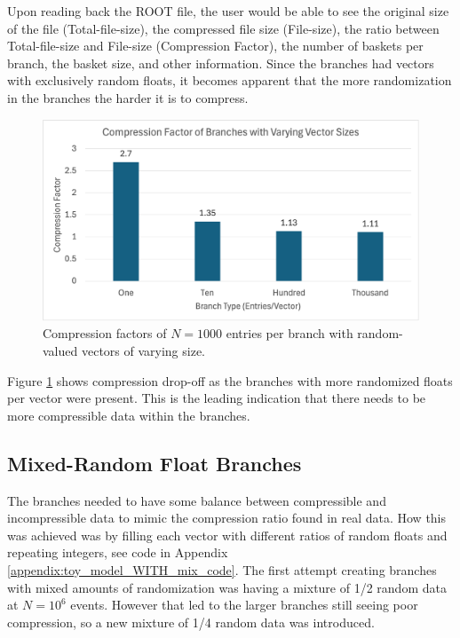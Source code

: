 Upon reading back the ROOT file, the user would be able to see the original size of the file (Total-file-size), the compressed file size (File-size), the ratio between Total-file-size and File-size (Compression Factor), the number of baskets per branch, the basket size, and other information. 
Since the branches had vectors with exclusively random floats, it becomes apparent that the more randomization in the branches the harder it is to compress. 

\begin{figure}[h]
    \centering
    \includegraphics[width=.8\textwidth]{content/toymodel_content/branch_compfacts_nomix.png}
    \caption{Compression factors of $N=1000$ entries per branch with random-valued vectors of varying size.}
    \label{fig:toymodel_compF_rndm_vectors}
\end{figure}


Figure \ref{fig:toymodel_compF_rndm_vectors} shows compression drop-off as the branches with more randomized floats per vector were present.
This is the leading indication that there needs to be more compressible data within the branches. 

\subsection{Mixed-Random Float Branches}
The branches needed to have some balance between compressible and incompressible data to mimic the compression ratio found in real data.
How this was achieved was by filling each vector with different ratios of random floats and repeating integers, see code in Appendix \ref{appendix:toy_model_WITH_mix_code}.
The first attempt creating branches with mixed amounts of randomization was having a mixture of 1/2 random data at $N=10^6$ events. 
However that led to the larger branches still seeing poor compression, so a new mixture of 1/4 random data was introduced. 

